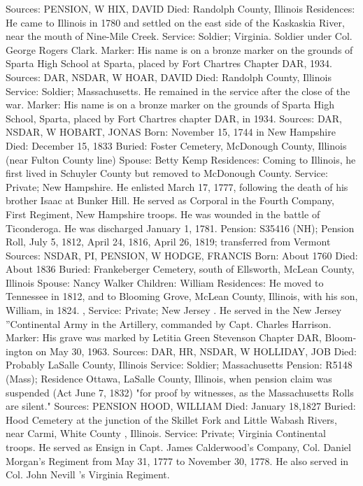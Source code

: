 Sources: PENSION, W 
HIX, DAVID 
Died: Randolph County, Illinois 
Residences: He came to Illinois in 1780 and settled on the east side of the Kaskaskia River, near the mouth of Nine-Mile Creek. 
Service: Soldier; Virginia. Soldier under Col. George Rogers Clark. 
Marker: His name is on a bronze marker on the grounds of Sparta High School at Sparta, placed by Fort Chartres Chapter DAR, 1934. 
Sources: DAR, NSDAR, W 
HOAR, DAVID 
Died: Randolph County, Illinois 
Service: Soldier; Massachusetts. He remained in the service after the close of the war. 
Marker: His name is on a bronze marker on the grounds of Sparta High School, Sparta, placed by Fort Chartres chapter DAR, in 1934. 
Sources: DAR, NSDAR, W 
HOBART, JONAS 
Born: November 15, 1744 in New Hampshire 
Died: December 15, 1833 
Buried: Foster Cemetery, McDonough County, Illinois (near Fulton County line) 
Spouse: Betty Kemp 
Residences: Coming to Illinois, he first lived in Schuyler County but removed to McDonough County. 
Service: Private; New Hampshire. He enlisted March 17, 1777, following the death of his brother Isaac at Bunker Hill. He served as Corporal in the Fourth Company, First Regiment, New Hampshire troops. He was wounded in the battle of Ticonderoga. He was discharged January 1, 1781. 
Pension: S35416 (NH); Pension Roll, July 5, 1812, April 24, 1816, April 26, 1819; transferred from Vermont 
Sources: NSDAR, PI, PENSION, W 
HODGE, FRANCIS 
Born: About 1760 
Died: About 1836 
Buried: Frankeberger Cemetery, south of Ellsworth, McLean County, Illinois 
Spouse: Nancy Walker 
Children: William Residences: He moved to Tennessee in 1812, and to Blooming Grove, McLean County, Illinois, with his son, William, in 1824. , 
Service: Private; New Jersey . He served in the New Jersey ''Continental Army in the Artillery, commanded by Capt. Charles Harrison. 
Marker: His grave was marked by Letitia Green Stevenson Chapter DAR, Bloom­ington on May 30, 1963. 
Sources: DAR, HR, NSDAR, W 
HOLLIDAY, JOB 
Died: Probably LaSalle County, Illinois 
Service: Soldier; Massachusetts 
Pension: R5148 (Mass); Residence Ottawa, LaSalle County, Illinois, when pension claim was suspended (Act June 7, 1832) "for proof by witnesses, as the Massachusetts Rolls are silent." 
Sources: PENSION 
HOOD, WILLIAM 
Died: January 18,1827 
Buried: Hood Cemetery at the junction of the Skillet Fork and Little Wabash Rivers, near Carmi, White County , Illinois. 
Service: Private; Virginia Continental troops. He served as Ensign in Capt. James Calderwood's Company, Col. Daniel Morgan's Regiment from May 31, 1777 to November 30, 1778. He also served in Col. John Nevill 's Virginia Regiment. 
